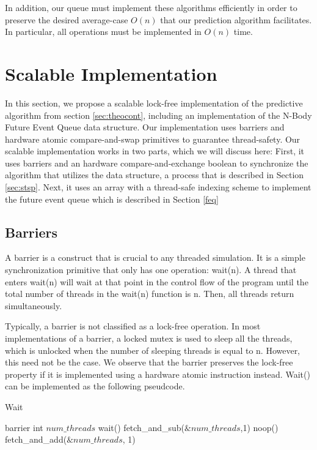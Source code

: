 \documentclass[conference]{IEEEtran}
\begin{document}
In addition, our queue must implement these algorithms efficiently in order to preserve the desired average-case $O(n)$ that our prediction algorithm facilitates.  In particular, all operations must be implemented in $O(n)$ time.

\section{Scalable Implementation}
In this section, we propose a scalable lock-free implementation of the predictive algorithm from section \ref{sec:theocont}, including an implementation of the 
N-Body Future Event Queue data structure.  Our implementation uses barriers and hardware atomic compare-and-swap primitives to guarantee thread-safety.  Our scalable implementation
works in two parts, which we will discuss here:  First, it uses barriers and an hardware compare-and-exchange boolean to synchronize the algorithm that utilizes the data structure, 
a process that is described in Section \ref{sec:stsp}.  Next, it uses an array with a thread-safe indexing scheme to implement the future event queue which is described in Section \ref{feq}
\subsection{Barriers}
\label{sec:barrier}
A barrier is a construct that is crucial to any threaded simulation.  It is a simple synchronization primitive that only has one operation: wait(n).  
A thread that enters wait(n) will wait at that point in the control flow of the program until the total number of threads in the wait(n) function is n.  Then,
all threads return simultaneously.

Typically, a barrier is not classified as a lock-free operation.  In most implementations of a barrier, a locked mutex is used to sleep all the threads, which is 
unlocked when the number of sleeping threads is equal to n.  However, this need not be the case.  We observe that the barrier preserves the lock-free property if it is implemented
using a hardware atomic instruction instead.  Wait() can be implemented as the following pseudcode.

\begin{algorithm}
\label{barrier}
\caption{Wait}
\begin{algorithmic}
\STATE barrier
	\STATE int $num\_threads$ 
	\STATE wait()
	\STATE {}
	\STATE fetch\_and\_sub($\&num\_threads$,1)
	\STATE {}
		\STATE noop()
	\ENDWHILE
	\STATE {}
	\STATE fetch\_and\_add($\&num\_threads$, 1)
\end{algorithmic}
\end{algorithm}
\end{document}
